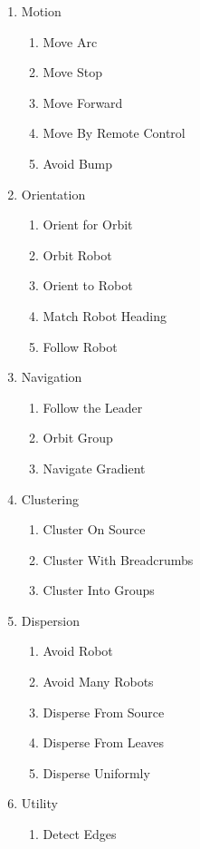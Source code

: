 \documentclass[]{article}
\begin{document}
\begin{multicols}{2}
	\begin{enumerate}[noitemsep]
	\item Motion
		\begin{enumerate}[noitemsep]
		\item Move Arc
		\item Move Stop
		\item Move Forward
		\item Move By Remote Control
		\item Avoid Bump
		\end{enumerate}
	\item Orientation
		\begin{enumerate}[noitemsep]
		\item Orient for Orbit
		\item Orbit Robot
		\item Orient to Robot
		\item Match Robot Heading
		\item Follow Robot
		\end{enumerate}
	\item Navigation
		\begin{enumerate}[noitemsep]
		\item Follow the Leader
		\item Orbit Group
		\item Navigate Gradient
		\end{enumerate}
	\item Clustering
		\begin{enumerate}[noitemsep]
		\item Cluster On Source
		\item Cluster With Breadcrumbs
		\item Cluster Into Groups
		\end{enumerate}
	\item Dispersion
		\begin{enumerate}[noitemsep]
		\item Avoid Robot
		\item Avoid Many Robots
		\item Disperse From Source
		\item Disperse From Leaves
		\item Disperse Uniformly
		\end{enumerate}
	\item Utility
		\begin{enumerate}[noitemsep]
		\item Detect Edges
		\end{enumerate}
	\end{enumerate}
\end{multicols} 
\end{document}
